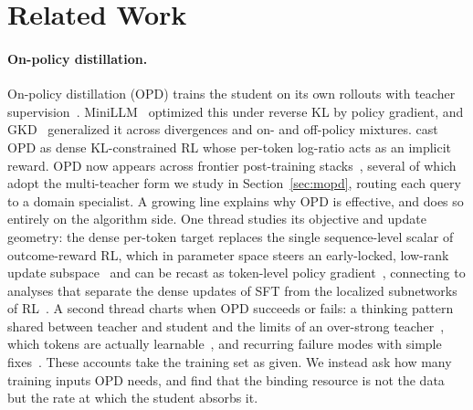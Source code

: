 
\section{Related Work}
\label{sec:related}

\paragraph{On-policy distillation.}
On-policy distillation (OPD) trains the student on its own rollouts with teacher supervision~\citep{song2026survey}. MiniLLM~\citep{gu2024minillm} optimized this under reverse KL by policy gradient, and GKD~\citep{agarwal2024policy} generalized it across divergences and on- and off-policy mixtures. \citet{yang2026learning} cast OPD as dense KL-constrained RL whose per-token log-ratio acts as an implicit reward. OPD now appears across frontier post-training stacks~\citep{yang2025qwen3,zeng2026glm,xiao2026mimo,xu2026deepseek,blakeman2026nemotron}, several of which adopt the multi-teacher form we study in Section~\ref{sec:mopd}, routing each query to a domain specialist. A growing line explains why OPD is effective, and does so entirely on the algorithm side. One thread studies its objective and update geometry: the dense per-token target replaces the single sequence-level scalar of outcome-reward RL, which in parameter space steers an early-locked, low-rank update subspace~\citep{cai2026learning,shen2026geometry} and can be recast as token-level policy gradient~\citep{ko2026scaling}, connecting to analyses that separate the dense updates of SFT from the localized subnetworks of RL~\citep{mukherjee2026reinforcement,zhu2025path}. A second thread charts when OPD succeeds or fails: a thinking pattern shared between teacher and student and the limits of an over-strong teacher~\citep{li2026rethinking}, which tokens are actually learnable~\citep{armandpour2026unmasking,wang2026not}, and recurring failure modes with simple fixes~\citep{zhu2026many,fu2026revisiting}. These accounts take the training set as given. We instead ask how many training inputs OPD needs, and find that the binding resource is not the data but the rate at which the student absorbs it.

